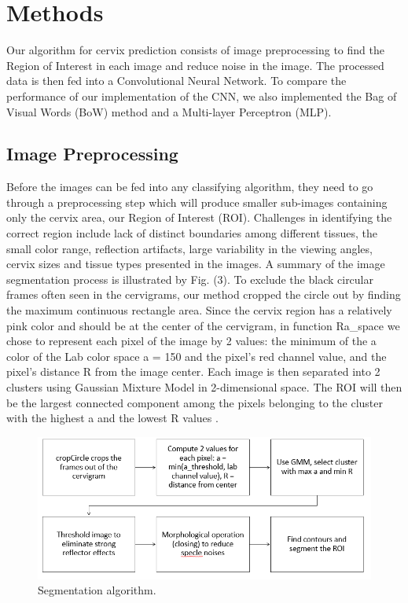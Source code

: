 \documentclass{article}
\begin{document}
\section{Methods}
Our algorithm for cervix prediction consists of image preprocessing to find the Region of Interest in each image and reduce noise in the image. The processed data is then fed into a Convolutional Neural Network. To compare the performance of our implementation of the CNN, we also implemented the Bag of Visual Words (BoW) method and a Multi-layer Perceptron (MLP).

\subsection{Image Preprocessing}

Before the images can be fed into any classifying algorithm, they need
to go through a preprocessing step which will produce smaller
sub-images containing only the cervix area, our Region of Interest
(ROI). Challenges in identifying the correct region include lack of
distinct boundaries among different tissues, the small color range,
reflection artifacts, large variability in the viewing angles, cervix
sizes and tissue types presented in the images. A summary of the image
segmentation process is illustrated by Fig. (3). To exclude the black circular frames often seen in the cervigrams, our method cropped the circle out by finding the maximum continuous rectangle area. Since the cervix region has a relatively pink color and should be at the center of the cervigram, in function Ra\_space we chose to represent each pixel of the image by 2 values: the minimum of the a color of the Lab color space a = 150 and the pixel’s red channel value, and the pixel’s distance R from the image center. Each image is then separated into 2 clusters using Gaussian Mixture Model in 2-dimensional space. The ROI will then be the largest connected component among the pixels belonging to the cluster with the highest a and the lowest R values \cite{kernel}. 

\begin{figure}[ht]
  \vskip 0.2in
  \begin{center}
  \centerline{\includegraphics[width=\columnwidth]{flowchart}}
  \caption {Segmentation algorithm.}
  \label{cnn}
  \end{center}
  \vskip -0.2in
\end{figure}
\end{document}

